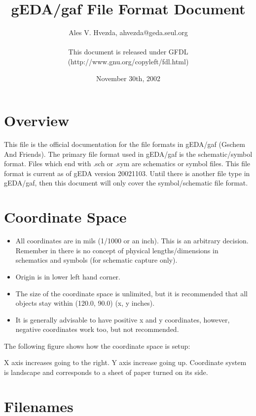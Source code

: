 \documentclass{article}
\title{gEDA/gaf File Format Document}
\author{Ales V. Hvezda, ahvezda@geda.seul.org\\
        \\
        This document is released under GFDL\\
        (http://www.gnu.org/copyleft/fdl.html)}
\date{November 30th, 2002}
\begin{document}
\maketitle
\newpage

\tableofcontents
\newpage


\section{Overview}

This file is the official documentation for the file formats in gEDA/gaf
(Gschem And Friends).  The primary file format used in gEDA/gaf is the
schematic/symbol format.  Files which end with .sch or .sym are schematics
or symbol files. This file format is current as of gEDA version 20021103.
Until there is another file type in gEDA/gaf, then this document will
only cover the symbol/schematic file format.


\section{Coordinate Space}
\begin{itemize}
 \item All coordinates are in mils (1/1000 or an inch).  This is an arbitrary decision. Remember in there is no concept of physical lengths/dimensions in schematics
and symbols (for schematic capture only).  
 \item Origin is in lower left hand corner.
 \item The size of the coordinate space is unlimited, but it is recommended that all objects stay within (120.0, 90.0) (x, y inches).
 \item It is generally advisable to have positive x and y coordinates, however, negative coordinates work too, but not recommended.
\end{itemize}

The following figure shows how the coordinate space is setup:

\begin{center}
\end{center}

X axis increases going to the right.  Y axis increase going up.
Coordinate system is landscape and corresponds to a sheet of paper turned
on its side.


\section{Filenames}
\end{document}
